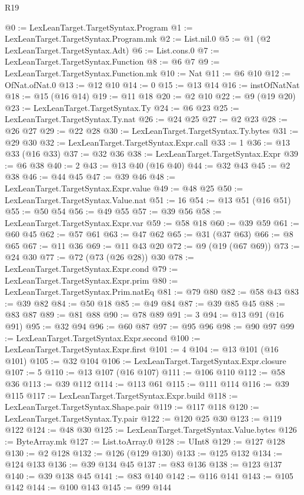 \begin{lexlean}{R19}
\begin{coremodule}
{{{{{{{{{{{{{{{@0 := LexLeanTarget.TargetSyntax.Program
@1 := LexLeanTarget.TargetSyntax.Program.mk
@2 := List.nil.{0}
@5 := @1 (@2 LexLeanTarget.TargetSyntax.Adt)
@6 := List.cons.{0}
@7 := LexLeanTarget.TargetSyntax.Function
@8 := @6 @7
@9 := LexLeanTarget.TargetSyntax.Function.mk
@10 := Nat
@11 := @6 @10
@12 := OfNat.ofNat.{0}
@13 := @12 @10
@14 := 0
@15 := @13 @14
@16 := instOfNatNat
@18 := @15 (@16 @14)
@19 := @11 @18
@20 := @2 @10
@22 := @9 (@19 @20)
@23 := LexLeanTarget.TargetSyntax.Ty
@24 := @6 @23
@25 := LexLeanTarget.TargetSyntax.Ty.nat
@26 := @24 @25
@27 := @2 @23
@28 := @26 @27
@29 := @22 @28
@30 := LexLeanTarget.TargetSyntax.Ty.bytes
@31 := @29 @30
@32 := LexLeanTarget.TargetSyntax.Expr.call
@33 := 1
@36 := @13 @33 (@16 @33)
@37 := @32 @36
@38 := LexLeanTarget.TargetSyntax.Expr
@39 := @6 @38
@40 := 2
@43 := @13 @40 (@16 @40)
@44 := @32 @43
@45 := @2 @38
@46 := @44 @45
@47 := @39 @46
@48 := LexLeanTarget.TargetSyntax.Expr.value
@49 := @48 @25
@50 := LexLeanTarget.TargetSyntax.Value.nat
@51 := 16
@54 := @13 @51 (@16 @51)
@55 := @50 @54
@56 := @49 @55
@57 := @39 @56
@58 := LexLeanTarget.TargetSyntax.Expr.var
@59 := @58 @18
@60 := @39 @59
@61 := @60 @45
@62 := @57 @61
@63 := @47 @62
@65 := @31 (@37 @63)
@66 := @8 @65
@67 := @11 @36
@69 := @11 @43 @20
@72 := @9 (@19 (@67 @69))
@73 := @24 @30
@77 := @72 (@73 (@26 @28)) @30
@78 := LexLeanTarget.TargetSyntax.Expr.cond
@79 := LexLeanTarget.TargetSyntax.Expr.prim
@80 := LexLeanTarget.TargetSyntax.Prim.natEq
@81 := @79 @80
@82 := @58 @43
@83 := @39 @82
@84 := @50 @18
@85 := @49 @84
@87 := @39 @85 @45
@88 := @83 @87
@89 := @81 @88
@90 := @78 @89
@91 := 3
@94 := @13 @91 (@16 @91)
@95 := @32 @94
@96 := @60 @87
@97 := @95 @96
@98 := @90 @97
@99 := LexLeanTarget.TargetSyntax.Expr.second
@100 := LexLeanTarget.TargetSyntax.Expr.first
@101 := 4
@104 := @13 @101 (@16 @101)
@105 := @32 @104
@106 := LexLeanTarget.TargetSyntax.Expr.closure
@107 := 5
@110 := @13 @107 (@16 @107)
@111 := @106 @110
@112 := @58 @36
@113 := @39 @112
@114 := @113 @61
@115 := @111 @114
@116 := @39 @115
@117 := LexLeanTarget.TargetSyntax.Expr.build
@118 := LexLeanTarget.TargetSyntax.Shape.pair
@119 := @117 @118
@120 := LexLeanTarget.TargetSyntax.Ty.pair
@122 := @120 @25 @30
@123 := @119 @122
@124 := @48 @30
@125 := LexLeanTarget.TargetSyntax.Value.bytes
@126 := ByteArray.mk
@127 := List.toArray.{0}
@128 := UInt8
@129 := @127 @128
@130 := @2 @128
@132 := @126 (@129 @130)
@133 := @125 @132
@134 := @124 @133
@136 := @39 @134 @45
@137 := @83 @136
@138 := @123 @137
@140 := @39 @138 @45
@141 := @83 @140
@142 := @116 @141
@143 := @105 @142
@144 := @100 @143
@145 := @99 @144
}}}}}}}}}}}}}}}
\end{coremodule}
\end{lexlean}
